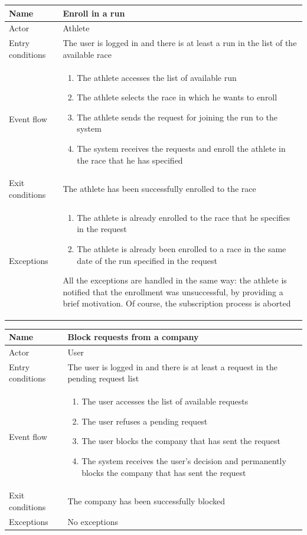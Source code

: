 \begin{table}[H]
\begin{tabularx}{\textwidth}{|l|X|}
\hline
 Name & Enroll in a run \\ \hline
 Actor & Athlete \\ \hline
 Entry conditions & The user is logged in and there is at least a run in the list of the available race \\ \hline
 Event flow & 
 \begin{enumerate}
 	\item The athlete accesses the list of available run
  	\item The athlete selects the race in which he wants to enroll
 	\item The athlete sends the request for joining the run to the system 
 	\item The system receives the requests and enroll the athlete in the race that he has specified 
 \end{enumerate}   \\ \hline
 Exit conditions & The athlete has been successfully enrolled to the race \\ \hline
 Exceptions &  
 \begin{enumerate}
 	\item The athlete is already enrolled to the race that he specifies in the request
 	\item The athlete is already been enrolled to a race in the same date of the run specified in the request 
 \end{enumerate}
 All the exceptions are handled in the same way: the athlete is notified that the enrollment was unsuccessful, by providing a brief motivation. Of course, the subscription process is aborted  
 \\ \hline
\end{tabularx}
\end{table}


\begin{table}[H]
\begin{tabularx}{\textwidth}{|l|X|}
\hline
 Name & Block requests from a company \\ \hline
 Actor & User \\ \hline
 Entry conditions & The user is logged in and there is at least a request in the pending request list \\ \hline
 Event flow & 
 \begin{enumerate}
 	\item The user accesses the list of available requests
  	\item The user refuses a pending request 
 	\item The user blocks the company that has sent the request
 	\item The system receives the user's decision and permanently blocks the company that has sent the request
 \end{enumerate}   \\ \hline
 Exit conditions & The company has been successfully blocked \\ \hline
 Exceptions &  No exceptions
 \\ \hline
\end{tabularx}
\end{table}


